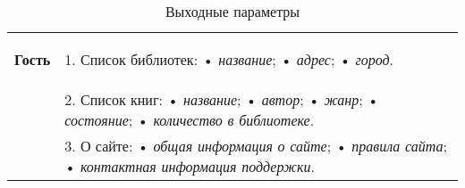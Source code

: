 \begin{longtable}{|p{0.5cm}|p{15.5cm}|}
	\caption{Выходные параметры}
	\label{tbl:output-data} \\
	\hline
	
	\begin{rotatebox}[origin=r]{90}
		{\textbf{Гость}}
	\end{rotatebox} 
	& 
	1. Список библиотек: \newline
    • \textit{название}; \newline
    • \textit{адрес}; \newline
    • \textit{город}. \\
	\cline{2-2}
    &
  2. Список книг: \newline
    • \textit{название}; \newline
    • \textit{автор}; \newline
    • \textit{жанр}; \newline
    • \textit{состояние}; \newline
    • \textit{количество в библиотеке}. \\
	\cline{2-2}
    &
	3. О сайте: \newline
   • \textit{общая информация о сайте}; \newline
   • \textit{правила сайта}; \newline
   • \textit{контактная информация поддержки}. \\
	\hline
	

\end{longtable}

